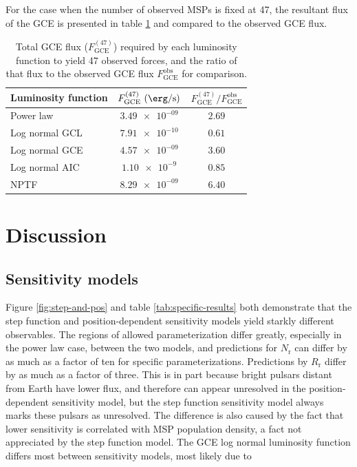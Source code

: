 \documentclass[a4paper,11pt]{article}
\newcommand{\comment}[1]{\emph{\color{red}{#1}}}
\begin{document}
For the case when the number of observed MSPs is fixed at 47, the resultant flux of the GCE is presented in table \ref{tab:rescaled-gce-flux} and compared to the observed GCE flux.

\begin{table}
    \centering
    \begin{tabular} {|l|c|c|}
        \hline
        Luminosity function & $F_\text{GCE}^{(47)}\ (\SI{}{\erg\per\second})$ & $F^{(47)}_\text{GCE} / F^\text{obs}_\text{GCE}$\\ \hline \hline
        Power law & $\num{3.49e-09}$ & $\num{2.69}$\\
        Log normal GCL & $\num{7.91e-10}$ & $\num{0.61}$ \\
        Log normal GCE & $\num{4.57e-09}$ & $\num{3.60}$\\
        Log normal AIC & $\num{1.10e-9}$ & $\num{0.85}$ \\
        NPTF & $\num{8.29e-09}$ & $\num{6.40}$\\
        \hline
    \end{tabular}
    \caption{Total GCE flux ($F_\text{GCE}^{(47)}$) required by each luminosity function to yield 47 observed forces, and the ratio of that flux to the observed GCE flux $F_\text{GCE}^\text{obs}$ for comparison.}
    \label{tab:rescaled-gce-flux}
\end{table}





\section{Discussion}

\subsection{Sensitivity models}
Figure \ref{fig:step-and-pos} and table \ref{tab:specific-results} both demonstrate that the step function and position-dependent sensitivity models yield starkly different observables. The regions of allowed parameterization differ greatly, especially in the power law case, between the two models, and predictions for $N_\text{r}$ can differ by as much as a factor of ten for specific parameterizations. Predictions by $R_\text{r}$ differ by as much as a factor of three. This is in part because bright pulsars distant from Earth have lower flux, and therefore can appear unresolved in the position-dependent sensitivity model, but the step function sensitivity model always marks these pulsars as unresolved. The difference is also caused by the fact that lower sensitivity is correlated with MSP population density, a fact not appreciated by the step function model. The GCE log normal luminosity function differs most between sensitivity models, most likely due to \comment{it's thinness and low mean, but I need to think more about exactly why this is.}
\end{document}
